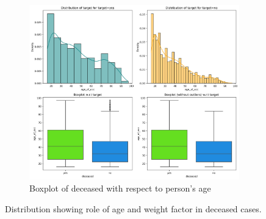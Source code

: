 \documentclass[12pt,a4paper]{article}
\begin{document}
\begin{figure}[h]
\begin{subfigure}[t]{0.495\linewidth}
			\includegraphics[width=\linewidth]{age_of_occ_wrt_target.png}
			\caption{Boxplot of deceased with respect to person's age}
			\label{fig:age_factor}
		\end{subfigure}
		\caption{Distribution showing role of age and weight factor in deceased cases.}
		\label{fig:Distribution showing role of age and weight factor in deceased cases. }
	\end{figure}
\end{document}
